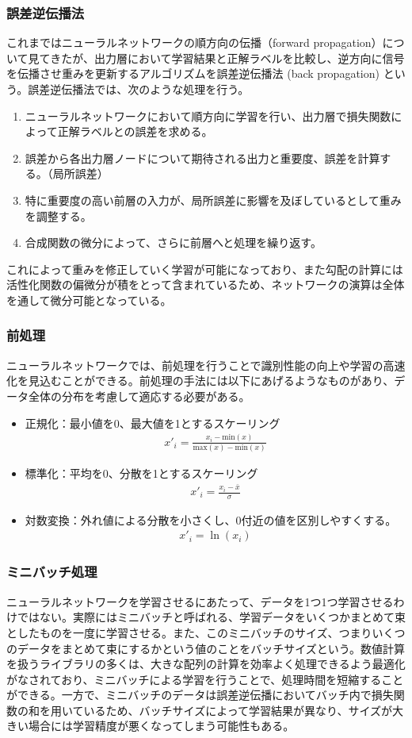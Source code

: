 \subsubsection{誤差逆伝播法}
これまではニューラルネットワークの順方向の伝播（forward propagation）について見てきたが、出力層において学習結果と正解ラベルを比較し、逆方向に信号を伝播させ重みを更新するアルゴリズムを誤差逆伝播法 (back propagation) という。誤差逆伝播法では、次のような処理を行う。
\begin{enumerate}
	\item ニューラルネットワークにおいて順方向に学習を行い、出力層で損失関数によって正解ラベルとの誤差を求める。
	\item 誤差から各出力層ノードについて期待される出力と重要度、誤差を計算する。（局所誤差）
	\item 特に重要度の高い前層の入力が、局所誤差に影響を及ぼしているとして重みを調整する。
	\item 合成関数の微分によって、さらに前層へと処理を繰り返す。
\end{enumerate}
これによって重みを修正していく学習が可能になっており、また勾配の計算には活性化関数の偏微分が積をとって含まれているため、ネットワークの演算は全体を通して微分可能となっている。

\subsubsection{前処理}
ニューラルネットワークでは、前処理を行うことで識別性能の向上や学習の高速化を見込むことができる。前処理の手法には以下にあげるようなものがあり、データ全体の分布を考慮して適応する必要がある。
\begin{itemize}
 \item 正規化：最小値を0、最大値を1とするスケーリング
 \begin{align}x'_i = \frac{x_i - \mathrm{min}(x)}{\mathrm{max}(x)-\mathrm{min}(x)}\end{align}
 \item 標準化：平均を0、分散を1とするスケーリング
 \begin{align}x'_i = \frac{x_i - \bar{x}}{\sigma}\end{align}
 \item 対数変換：外れ値による分散を小さくし、0付近の値を区別しやすくする。
 \begin{align}x'_i = \ln(x_i)\end{align}
\end{itemize}
\subsubsection{ミニバッチ処理}
ニューラルネットワークを学習させるにあたって、データを1つ1つ学習させるわけではない。実際にはミニバッチと呼ばれる、学習データをいくつかまとめて束としたものを一度に学習させる。また、このミニバッチのサイズ、つまりいくつのデータをまとめて束にするかという値のことをバッチサイズという。数値計算を扱うライブラリの多くは、大きな配列の計算を効率よく処理できるよう最適化がなされており、ミニバッチによる学習を行うことで、処理時間を短縮することができる。一方で、ミニバッチのデータは誤差逆伝播においてバッチ内で損失関数の和を用いているため、バッチサイズによって学習結果が異なり、サイズが大きい場合には学習精度が悪くなってしまう可能性もある。

